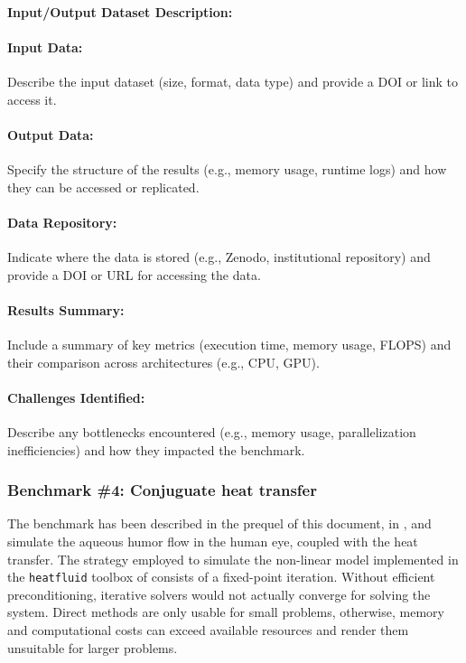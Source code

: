 \paragraph{Input/Output Dataset Description:}
\paragraph{Input Data:} Describe the input dataset (size, format, data type) and provide a DOI or link to access it.

\paragraph{Output Data:} Specify the structure of the results (e.g., memory usage, runtime logs) and how they can be accessed or replicated.

\paragraph{Data Repository:} Indicate where the data is stored (e.g., Zenodo, institutional repository) and provide a DOI or URL for accessing the data.

\paragraph{Results Summary:} Include a summary of key metrics (execution time, memory usage, FLOPS) and their comparison across architectures (e.g., CPU, GPU).

\paragraph{Challenges Identified:} Describe any bottlenecks encountered (e.g., memory usage, parallelization inefficiencies) and how they impacted the benchmark.

\subsubsection{Benchmark \#4: Conjuguate heat transfer}



The benchmark has been described in the prequel of this document, in , and simulate the aqueous humor flow in the human eye, coupled with the heat transfer.
The strategy employed to simulate the non-linear model implemented in the \texttt{heatfluid} toolbox of \Feelpp consists of a fixed-point iteration.
Without efficient preconditioning, iterative solvers would not actually converge for solving the system.
Direct methods are only usable for small problems, otherwise, memory and computational costs can exceed available resources and render them unsuitable for larger problems.

